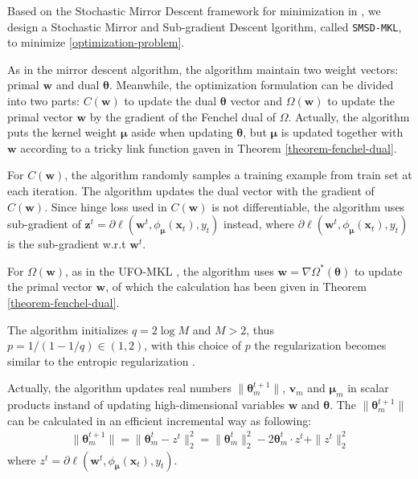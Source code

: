 \documentclass{article}
\begin{document}
Based on the Stochastic Mirror Descent framework for minimization in \cite{Shalev-ShwartzT11, OrabonaL11},
  we design a Stochastic Mirror and Sub-gradient Descent lgorithm, called \texttt{SMSD-MKL}, to minimize \eqref{optimization-problem}.

 As in the mirror descent algorithm, the algorithm maintain two weight vectors: primal $\pmb{w}$ and dual $\pmb{\theta}$. Meanwhile, the optimization formulation can be divided into two parts: $C(\pmb{w})$ to update the dual $\pmb{\theta}$ vector and $\Omega(\pmb{w})$ to update the primal vector $\pmb{w}$ by the gradient of the Fenchel dual of $\Omega$. Actually, the algorithm puts the kernel weight $\pmb{\mu}$ aside when updating $\pmb{\theta}$, but $\pmb{\mu}$ is updated together with $\pmb{w}$ according to a tricky link function gaven in Theorem \ref{theorem-fenchel-dual}.

For $C(\pmb{w})$, the algorithm randomly samples a training example from train set at each iteration. The algorithm updates the dual vector with the gradient of $C(\pmb{w})$. Since hinge loss used in $C(\pmb{w})$ is not differentiable, the algorithm uses sub-gradient of $\mathbf{z}^t=\partial\ell(\pmb{w}^t,\phi_{\bm \mu}(\mathbf{x}_t), y_t)$ instead, where $\partial\ell(\pmb{w}^t,\phi_{\bm \mu}(\mathbf{x}_t), y_t)$ is the sub-gradient w.r.t $\pmb{w}^t$.

For $\Omega(\pmb{w})$, as in the UFO-MKL \cite{OrabonaL11}, the algorithm uses $\pmb{w}=\nabla\Omega^\ast(\pmb{\theta})$ to update the primal vector $\pmb{w}$, of which the calculation has been given in Theorem \ref{theorem-fenchel-dual}.

The algorithm initializes $q=2\log M$ and $M>2$, thus $p=1/(1-1/q) \in (1,2)$, with this choice of $p$ the regularization becomes similar to the entropic regularization \cite{OrabonaFCC10}.

Actually, the algorithm updates real numbers $\|\pmb{\theta}_m^{t+1}\|$, $\pmb{v}_m$ and $\mathbf{\mu}_m$ in scalar products instand of updating high-dimensional variables $\pmb{w}$ and $\pmb{\theta}$. The $\|\pmb{\theta}_m^{t+1}\|$ can be calculated in an efficient incremental way as following:
\begin{align*}
\|\pmb{\theta}_m^{t+1}\|
=\|\pmb{\theta}_m^{t}-z^t\|_2^2
=\|\pmb{\theta}_m^{t}\|_2^2-2\pmb{\theta}_m^t \cdot z^t +\|z^t\|_2^2
\end{align*}
where $z^t=\partial\ell(\pmb{w}^t,\phi_{\bm \mu}(\mathbf{x}_t), y_t)$.
\end{document}
